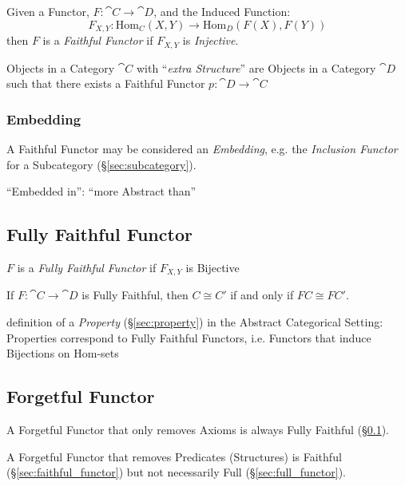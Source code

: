 Given a Functor, $F : \cat{C} \rightarrow \cat{D}$, and the Induced Function:
\[
  F_{X,Y} : \mathrm{Hom}_C(X,Y) \rightarrow \mathrm{Hom}_D(F(X),F(Y))
\]
then $F$ is a \emph{Faithful Functor} if $F_{X,Y}$ is \emph{Injective}.

Objects in a Category $\cat{C}$ with ``\emph{extra Structure}'' are Objects in a
Category $\cat{D}$ such that there exists a Faithful Functor
$p : \cat{D} \rightarrow \cat{C}$



\subsubsection{Embedding}\label{sec:category_embedding}

A Faithful Functor may be considered an \emph{Embedding}, e.g. the
\emph{Inclusion Functor} for a Subcategory (\S\ref{sec:subcategory}).

``Embedded in'': ``more Abstract than''



\subsection{Fully Faithful Functor}\label{sec:fully_faithful}

$F$ is a \emph{Fully Faithful Functor} if $F_{X,Y}$ is Bijective

If $F : \cat{C} \rightarrow \cat{D}$ is Fully Faithful, then $C
\cong C'$ if and only if $FC \cong FC'$.

definition of a \emph{Property} (\S\ref{sec:property}) in the Abstract
Categorical Setting: Properties correspond to Fully Faithful Functors, i.e.
Functors that induce Bijections on Hom-sets



\subsection{Forgetful Functor}\label{sec:forgetful_functor}

A Forgetful Functor that only removes Axioms is always Fully Faithful
(\S\ref{sec:fully_faithful}).

A Forgetful Functor that removes Predicates (Structures) is Faithful
(\S\ref{sec:faithful_functor}) but not necessarily Full
(\S\ref{sec:full_functor}).

